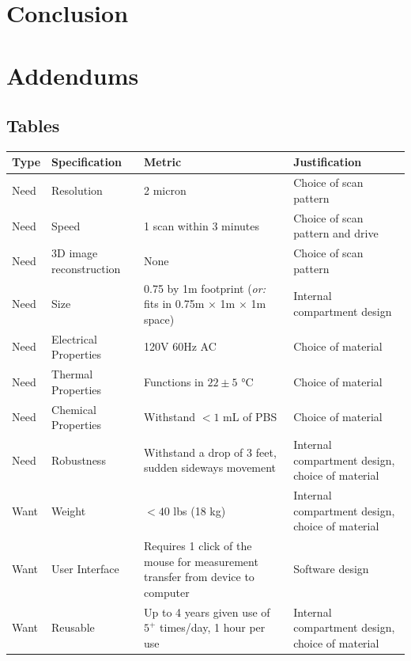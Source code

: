 \documentclass{article}
\begin{document}
\section{Conclusion}
\label{sec:conclusion}


\section{Addendums}
\label{sec:addendums}

\subsection{Tables}
\label{sec:tables}

\begin{table}[H]
  \footnotesize
  \centering
  \begin{tabularx}{\textwidth}{llXX}
    \toprule
    \textbf{Type} & \textbf{Specification} & \textbf{Metric} & \textbf{Justification} \\
    \hline
    Need & Resolution & 2 micron & Choice of scan pattern \\
    Need & Speed & 1 scan within 3 minutes & Choice of scan pattern and drive \\
    Need & 3D image reconstruction & None & Choice of scan pattern \\
    Need & Size & 0.75 by 1m footprint (\textit{or:} fits in 0.75m $\times$ 1m $\times$ 1m space) & Internal compartment design \\
    Need & Electrical Properties & 120V 60Hz AC & Choice of material \\
    Need & Thermal Properties & Functions in $22\pm5$ °C & Choice of material \\
    Need & Chemical Properties & Withstand $<1$ mL of PBS & Choice of material \\
    Need & Robustness & Withstand a drop of 3 feet, sudden sideways movement & Internal compartment design, choice of material \\
    Want & Weight & $<40$ lbs (18 kg) & Internal compartment design, choice of material \\
    Want & User Interface & Requires 1 click of the mouse for measurement transfer from device to computer & Software design \\
    Want & Reusable & Up to 4 years given use of $5^+$ times/day, 1 hour per use & Internal compartment design, choice of material \\

\end{tabularx}
\end{table}
\end{document}
